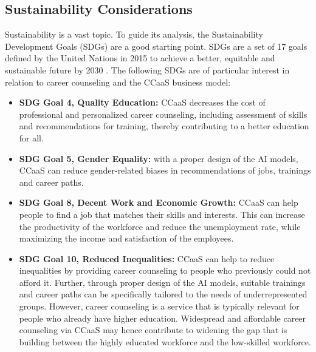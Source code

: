 \subsection{Sustainability Considerations}

Sustainability is a vast topic. To guide its analysis, the Sustainability Development Goals (SDGs) are a
good starting point. SDGs are a set of 17 goals defined by the United Nations in 2015 to achieve a better,
equitable and sustainable future by 2030 \citep{unitednationsTransformingOurWorld2015a}. The following SDGs
are of particular interest in relation to career counseling and the CCaaS business model:

\begin{itemize}
    \item \textbf{SDG Goal 4, Quality Education:} CCaaS decreases the cost of professional and personalized
        career counseling, including assessment of skills and recommendations for training, thereby
        contributing to a better education for all.
    \item \textbf{SDG Goal 5, Gender Equality:} with a proper design of the AI models, CCaaS can reduce 
        gender-related biases in recommendations of jobs, trainings and career paths.
    \item \textbf{SDG Goal 8, Decent Work and Economic Growth:} CCaaS can help people to find a job that
        matches their skills and interests. This can increase the productivity of the workforce and
        reduce the unemployment rate, while maximizing the income and satisfaction of the employees.
    \item \textbf{SDG Goal 10, Reduced Inequalities:} CCaaS can help to reduce inequalities by providing
        career counseling to people who previously could not afford it. Further, through proper design
        of the AI models, suitable trainings and career paths can be specifically tailored to the
        needs of underrepresented groups. However, career counseling is a service that is typically
        relevant for people who already have higher education. Widespread and affordable career
        counseling via CCaaS may hence contribute to widening the gap that is building between the
        highly educated workforce and the low-skilled workforce.
\end{itemize}


